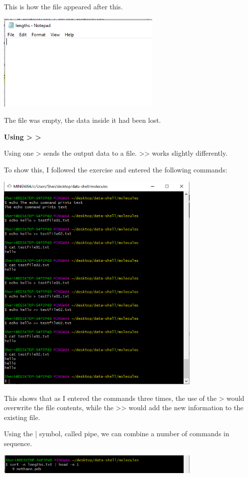 \documentclass{article}
\begin{document}
This is how the file appeared after this.

\includegraphics[width=8cm]{Images/GitBash_034.PNG}

The file was empty, the data inside it had been lost. 

\textbf{Using \textgreater{} \textgreater{}}

Using one \textgreater{} sends the output data to a file. \textgreater{}\textgreater{} works slightly differently.

To show this, I followed the exercise and entered the following commands:

\includegraphics[width=10cm]{Images/GitBash_035.PNG}

This shows that as I entered the commands three times, the use of the \textgreater{} would overwrite the file contents, while the \textgreater{}\textgreater{} would add the new information to the existing file.

Using the | symbol, called pipe, we can combine a number of commands in sequence. 

\includegraphics[width=10cm]{Images/GitBash_036.PNG}
\end{document}

